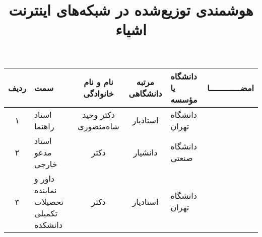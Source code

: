 \subject{مهندسی برق}

\title{هوشمندی توزیع‌شده در شبکه‌های اینترنت اشیاء}

\firstPage

\cleartorightpage
\besmPage

\cleartorightpage
\firstPage

\cleartorightpage


%
  


 \davaranPage
\vspace{.5cm}
\renewcommand{\arraystretch}{1.2}
 \begin{center}
   \begin{tabular}{|c|p{30mm}|c|c|p{25mm}|c|}
     \hline
     ردیف& سمت& نام و نام خانوادگی& مرتبه \newline دانشگاهی&دانشگاه یا مؤسسه& امضـــــــــــــا \\
     \hline
     ۱& استاد راهنما& دکتر وحید شاه‌منصوری& استاد‌یار& دانشگاه تهران                   &\\
     \hline
     ۲&‌استاد مدعو خارجی&دکتر&دانشیار& دانشگاه \newline صنعتی&                    \\
     \hline
     ۳& داور و نماینده \newline تحصیلات تکمیلی دانشکده & دکتر&استادیار                   & دانشگاه تهران& \\
     \hline
   \end{tabular}
 \end{center}

